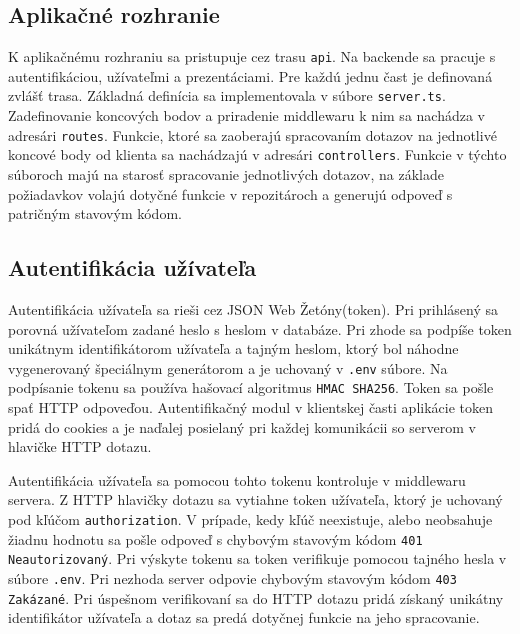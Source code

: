 \subsection{Aplikačné rozhranie}
K aplikačnému rozhraniu sa pristupuje cez trasu \texttt{api}. Na backende sa pracuje s autentifikáciou, užívateľmi a prezentáciami. Pre každú jednu čast je definovaná zvlášť trasa. Základná definícia sa implementovala v súbore \texttt{server.ts}. Zadefinovanie koncových bodov a priradenie middlewaru k nim sa nachádza v adresári \texttt{routes}. Funkcie, ktoré sa zaoberajú spracovaním dotazov na jednotlivé koncové body od klienta sa nachádzajú v adresári \texttt{controllers}. Funkcie v týchto súboroch majú na starosť spracovanie jednotlivých dotazov, na základe požiadavkov volajú dotyčné funkcie v repozitároch a generujú odpoveď s patričným stavovým kódom.

\subsection{Autentifikácia užívateľa}
\label{jwtauth}
Autentifikácia užívateľa sa rieši cez JSON Web Žetóny(token). Pri prihlásený sa porovná užívateľom zadané heslo s heslom v databáze. Pri zhode sa podpíše token unikátnym identifikátorom užívateľa a tajným heslom, ktorý bol náhodne vygenerovaný špeciálnym generátorom a je uchovaný v \texttt{.env} súbore. Na podpísanie tokenu sa používa hašovací algoritmus \texttt{HMAC SHA256}.
Token sa pošle spať HTTP odpoveďou. Autentifikačný modul v klientskej časti aplikácie token pridá do cookies a je naďalej posielaný pri každej komunikácii so serverom v hlavičke HTTP dotazu.

Autentifikácia užívateľa sa pomocou tohto tokenu kontroluje v middlewaru servera. Z HTTP hlavičky dotazu sa vytiahne token užívateľa, ktorý je uchovaný pod kľúčom \texttt{authorization}. V prípade, kedy kľúč neexistuje, alebo neobsahuje žiadnu hodnotu sa pošle odpoveď s chybovým stavovým kódom \texttt{401 Neautorizovaný}. Pri výskyte tokenu sa token verifikuje pomocou tajného hesla v súbore \texttt{.env}. Pri nezhoda server odpovie chybovým stavovým kódom \texttt{403 Zakázané}. Pri úspešnom verifikovaní sa do HTTP dotazu pridá získaný unikátny identifikátor užívateľa a dotaz sa predá dotyčnej funkcie na jeho spracovanie.